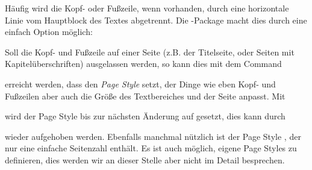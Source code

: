 Häufig wird die Kopf- oder Fußzeile, wenn vorhanden, durch eine horizontale Linie vom Hauptblock des Textes abgetrennt.
Die -Package macht dies durch eine einfach Option möglich:
\begin{latexlisting}
\usepackage[footsepline, headsepline]{scrlayer-scrpage}	
\end{latexlisting}
Soll die Kopf- und Fußzeile auf einer Seite (z.B. der Titelseite, oder Seiten mit Kapitelüberschriften) ausgelassen werden, so kann dies mit dem Command
\begin{latexlisting}
	\thispagestyle{empty}
\end{latexlisting}
erreicht werden, dass den \emph{Page Style} setzt, der Dinge wie eben Kopf- und Fußzeilen aber auch die Größe des Textbereiches und der Seite anpasst. Mit
\begin{latexlisting}
	\pagestyle{empty}
\end{latexlisting}
wird der Page Style bis zur nächsten Änderung auf  gesetzt, dies kann durch
\begin{latexlisting}
	\pagestyle{scrheadings}
\end{latexlisting}
wieder aufgehoben werden.
Ebenfalls manchmal nützlich ist der Page Style , der nur eine einfache Seitenzahl enthält.
Es ist auch möglich, eigene Page Styles zu definieren, dies werden wir an dieser Stelle aber nicht im Detail besprechen.


